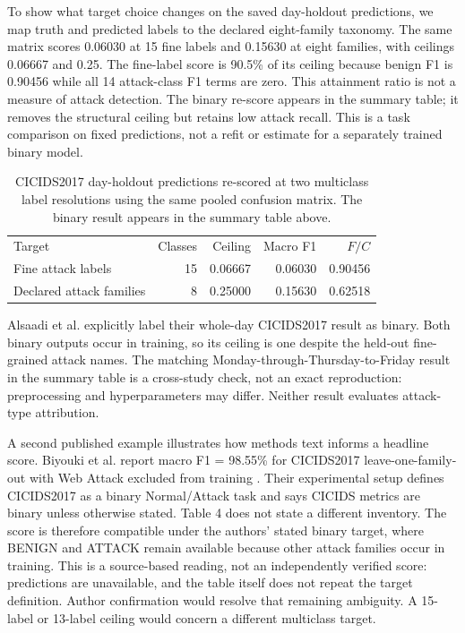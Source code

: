 \documentclass[journal]{IEEEtran}
\begin{document}
To show what target choice changes on the saved day-holdout predictions, we map truth and predicted labels to the declared eight-family taxonomy. The same matrix scores 0.06030 at 15 fine labels and 0.15630 at eight families, with ceilings 0.06667 and 0.25. The fine-label score is 90.5\% of its ceiling because benign F1 is 0.90456 while all 14 attack-class F1 terms are zero. This attainment ratio is not a measure of attack detection. The binary re-score appears in the summary table; it removes the structural ceiling but retains low attack recall. This is a task comparison on fixed predictions, not a refit or estimate for a separately trained binary model.

\begin{table}[h]\centering
\caption{CICIDS2017 day-holdout predictions re-scored at two multiclass label resolutions using the same pooled confusion matrix. The binary result appears in the summary table above.}
\begin{tabular}{lrrrr}
Target & Classes & Ceiling & Macro F1 & $F/C$ \\
Fine attack labels & 15 & 0.06667 & 0.06030 & 0.90456 \\
Declared attack families & 8 & 0.25000 & 0.15630 & 0.62518 \\
\end{tabular}\end{table}

Alsaadi et al. explicitly label their whole-day CICIDS2017 result as binary. Both binary outputs occur in training, so its ceiling is one despite the held-out fine-grained attack names. The matching Monday-through-Thursday-to-Friday result in the summary table is a cross-study check, not an exact reproduction: preprocessing and hyperparameters may differ. Neither result evaluates attack-type attribution.

A second published example illustrates how methods text informs a headline score. Biyouki et al. report macro F1 = 98.55\% for CICIDS2017 leave-one-family-out with Web Attack excluded from training \cite{biyouki2026}. Their experimental setup defines CICIDS2017 as a binary Normal/Attack task and says CICIDS metrics are binary unless otherwise stated. Table 4 does not state a different inventory. The score is therefore compatible under the authors' stated binary target, where BENIGN and ATTACK remain available because other attack families occur in training. This is a source-based reading, not an independently verified score: predictions are unavailable, and the table itself does not repeat the target definition. Author confirmation would resolve that remaining ambiguity. A 15-label or 13-label ceiling would concern a different multiclass target.
\end{document}
